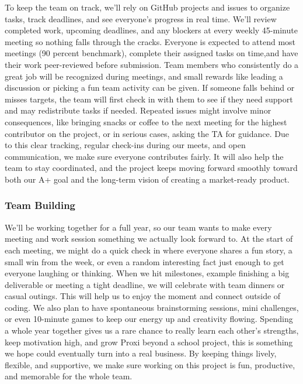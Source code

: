 \documentclass{article}
\begin{document}
To keep the team on track, we’ll rely on GitHub projects and issues to organize tasks, 
track deadlines, and see everyone’s progress in real time. We’ll review completed work, 
upcoming deadlines, and any blockers at every weekly 45-minute meeting so nothing falls through 
the cracks. Everyone is expected to attend most meetings (90 percent benchmark), 
complete their assigned tasks on time,and have their work peer-reviewed before submission. Team members who consistently do a great job 
will be recognized during meetings, and small rewards like leading a discussion or picking a fun 
team activity can be given. If someone falls behind or misses targets, the team will first check 
in with them to see if they need support and may redistribute tasks if needed. Repeated issues might 
involve minor consequences, like bringing snacks or coffee to the next meeting for the highest contributor on the project, or in serious cases, 
asking the TA for guidance. Due to this clear tracking, regular check-ins during our meets, and open communication, we make 
sure everyone contributes fairly. It will also help the team to stay coordinated, and the project keeps moving forward 
smoothly toward both our A+ goal and the long-term vision of creating a market-ready product.

\subsubsection*{Team Building}

We’ll be working together for a full year, so our team wants to make every meeting and work session something 
we actually look forward to. At the start of each meeting, we might do a quick check in where everyone shares 
a fun story, a small win from the week, or even a random interesting fact just enough to get everyone laughing 
or thinking. When we hit milestones, example finishing a big deliverable or meeting a tight deadline, we will
celebrate with team dinners or casual outings. This will help us to enjoy the moment and connect outside of coding. We also 
plan to have spontaneous brainstorming sessions, mini challenges, or even 10-minute games to keep our energy up and 
creativity flowing. Spending a whole year together gives us a rare chance to really learn each other’s strengths, 
keep motivation high, and grow Proxi beyond a school project, this is something we hope could eventually turn 
into a real business. By keeping things lively, flexible, and supportive, we make sure working on this project is fun, 
productive, and memorable for the whole team.
\end{document}
